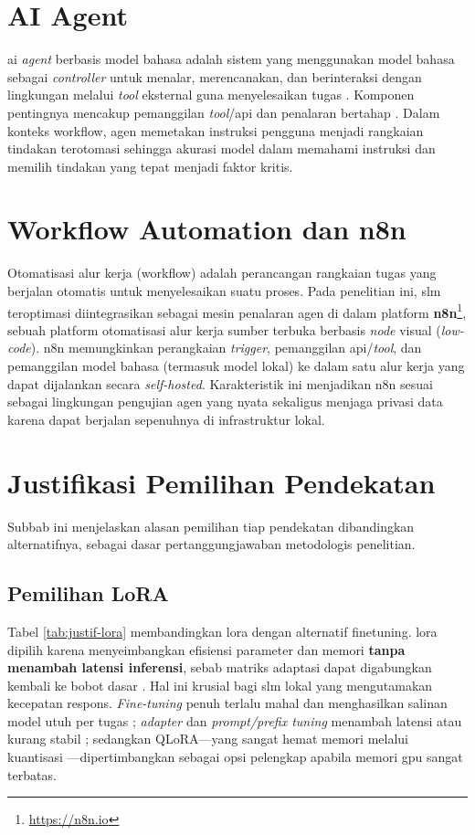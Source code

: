 \section{AI Agent}
\gls{ai} \textit{agent} berbasis model bahasa adalah sistem yang menggunakan model bahasa sebagai \textit{controller} untuk menalar, merencanakan, dan berinteraksi dengan lingkungan melalui \textit{tool} eksternal guna menyelesaikan tugas \citep{wang2024agentsurvey}. Komponen pentingnya mencakup pemanggilan \textit{tool}/\gls{api} \citep{schick2023toolformer} dan penalaran bertahap \citep{yao2023tot}. Dalam konteks \gls{workflow}, agen memetakan instruksi pengguna menjadi rangkaian tindakan terotomasi sehingga akurasi model dalam memahami instruksi dan memilih tindakan yang tepat menjadi faktor kritis.

\section{Workflow Automation dan n8n}
Otomatisasi alur kerja (\gls{workflow}) adalah perancangan rangkaian tugas yang berjalan otomatis untuk menyelesaikan suatu proses. Pada penelitian ini, \gls{slm} teroptimasi diintegrasikan sebagai mesin penalaran agen di dalam platform \textbf{n8n}\footnote{\url{https://n8n.io}}, sebuah platform otomatisasi alur kerja sumber terbuka berbasis \textit{node} visual (\textit{low-code}). n8n memungkinkan perangkaian \textit{trigger}, pemanggilan \gls{api}/\textit{tool}, dan pemanggilan model bahasa (termasuk model lokal) ke dalam satu alur kerja yang dapat dijalankan secara \textit{self-hosted}. Karakteristik ini menjadikan n8n sesuai sebagai lingkungan pengujian agen yang nyata sekaligus menjaga privasi data karena dapat berjalan sepenuhnya di infrastruktur lokal.

\section{Justifikasi Pemilihan Pendekatan}
Subbab ini menjelaskan alasan pemilihan tiap pendekatan dibandingkan alternatifnya, sebagai dasar pertanggungjawaban metodologis penelitian.

\subsection{Pemilihan LoRA}
Tabel \ref{tab:justif-lora} membandingkan \gls{lora} dengan alternatif \gls{finetuning}. \gls{lora} dipilih karena menyeimbangkan efisiensi parameter dan memori \textbf{tanpa menambah latensi inferensi}, sebab matriks adaptasi dapat digabungkan kembali ke bobot dasar \citep{hu2022lora}. Hal ini krusial bagi \gls{slm} lokal yang mengutamakan kecepatan respons. \textit{Fine-tuning} penuh terlalu mahal dan menghasilkan salinan model utuh per tugas \citep{ding2023delta}; \textit{adapter} dan \textit{prompt/prefix tuning} menambah latensi atau kurang stabil \citep{hu2023llmadapters, ding2023delta}; sedangkan QLoRA—yang sangat hemat memori melalui kuantisasi \citep{dettmers2023qlora}—dipertimbangkan sebagai opsi pelengkap apabila memori \gls{gpu} sangat terbatas.

